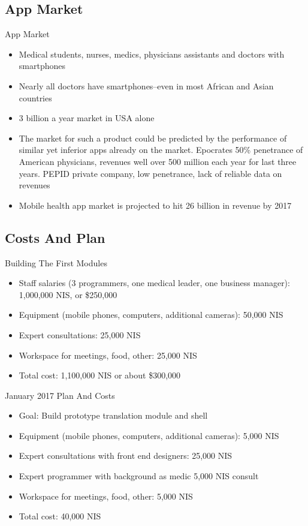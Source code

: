 \documentclass[presentation]{beamer}
\begin{document}
\subsection{App Market}
\label{sec-1-4}
\begin{frame}[label=sec-1-4-1]{App Market}
\begin{itemize}
\item Medical students, nurses, medics, physicians assistants and doctors
with smartphones
\item Nearly all doctors have smartphones--even in most African and Asian
countries
\item 3 billion a year market in USA alone
\item The market for such a product could be predicted by the performance
of similar yet inferior apps already on the market.  \alert{Epocrates} 50\%
penetrance of American physicians, revenues well over 500 million
each year for last three years.  \alert{PEPID} private company, low
penetrance, lack of reliable data on revenues
\item Mobile health app market is projected to hit 26 billion in revenue
by 2017
\end{itemize}
\end{frame}

\subsection{Costs And Plan}
\label{sec-1-5}
\begin{frame}[label=sec-1-5-1]{Building The First Modules}
\begin{itemize}
\item Staff salaries (3 programmers, one medical leader, one business
manager): 1,000,000 NIS, or \$250,000
\item Equipment (mobile phones, computers, additional cameras): 50,000
NIS
\item Expert consultations: 25,000 NIS
\item Workspace for meetings, food, other: 25,000 NIS
\item Total cost: 1,100,000 NIS or about \$300,000
\end{itemize}
\end{frame}

\begin{frame}[label=sec-1-5-2]{January 2017 Plan And Costs}
\begin{itemize}
\item Goal: Build prototype translation module and shell
\item Equipment (mobile phones, computers, additional cameras): 5,000
NIS
\item Expert consultations with front end designers: 25,000 NIS
\item Expert programmer with background as medic 5,000 NIS consult
\item Workspace for meetings, food, other: 5,000 NIS
\item Total cost: 40,000 NIS
\end{itemize}
\end{frame}
\end{document}
